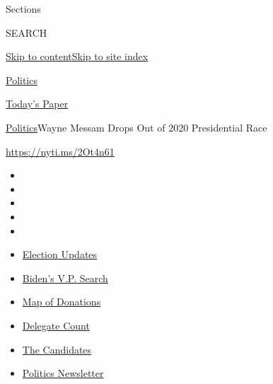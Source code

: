 Sections

SEARCH

\protect\hyperlink{site-content}{Skip to
content}\protect\hyperlink{site-index}{Skip to site index}

\href{https://www.nytimes.com/section/politics}{Politics}

\href{https://myaccount.nytimes.com/auth/login?response_type=cookie\&client_id=vi}{}

\href{https://www.nytimes.com/section/todayspaper}{Today's Paper}

\href{/section/politics}{Politics}\textbar{}Wayne Messam Drops Out of
2020 Presidential Race

\url{https://nyti.ms/2Ot4n61}

\begin{itemize}
\item
\item
\item
\item
\item
\end{itemize}

\begin{itemize}
\item
  \href{https://www.nytimes.com/2020/07/31/us/elections/biden-vs-trump.html?action=click\&pgtype=Article\&state=default\&region=TOP_BANNER\&context=storylines_menu}{Election
  Updates}
\item
  \href{https://www.nytimes.com/article/biden-vice-president-2020.html?action=click\&pgtype=Article\&state=default\&region=TOP_BANNER\&context=storylines_menu}{Biden's
  V.P. Search}
\item
  \href{https://www.nytimes.com/interactive/2020/07/24/us/politics/trump-biden-campaign-donors.html?action=click\&pgtype=Article\&state=default\&region=TOP_BANNER\&context=storylines_menu}{Map
  of Donations}
\item
  \href{https://www.nytimes.com/interactive/2020/us/elections/delegate-count-primary-results.html?action=click\&pgtype=Article\&state=default\&region=TOP_BANNER\&context=storylines_menu}{Delegate
  Count}
\item
  \href{https://www.nytimes.com/interactive/2019/us/politics/2020-presidential-candidates.html?action=click\&pgtype=Article\&state=default\&region=TOP_BANNER\&context=storylines_menu}{The
  Candidates}
\item
  \href{https://www.nytimes.com/newsletters/politics?action=click\&pgtype=Article\&state=default\&region=TOP_BANNER\&context=storylines_menu}{Politics
  Newsletter}
\end{itemize}

